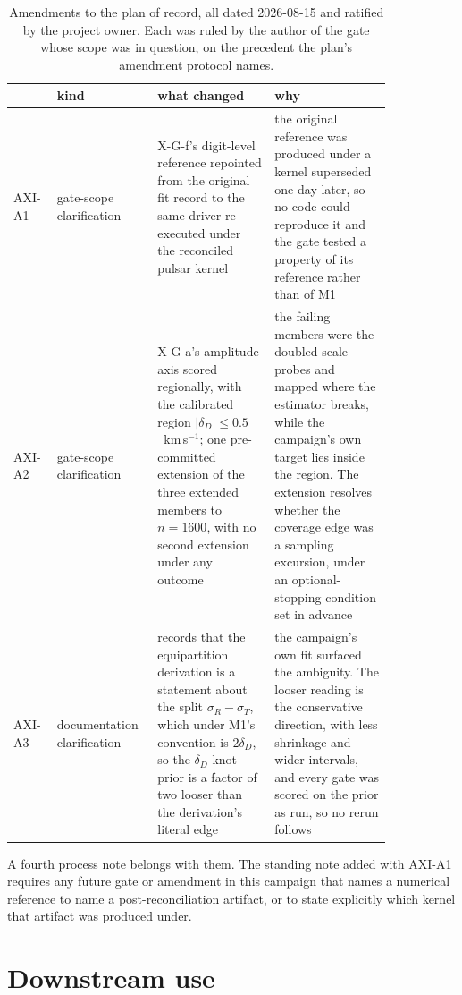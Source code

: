 \documentclass[11pt]{article}
\newcommand{\dD}{\ensuremath{\delta_D}}
\begin{document}
\begin{table}[htbp]
\centering
\small
\caption{Amendments to the plan of record, all dated 2026-08-15 and ratified by the project owner. Each was ruled by the author of the gate whose scope was in question, on the precedent the plan's amendment protocol names.}
\label{tab:amendments}
\begin{tabular}{p{0.09\linewidth}p{0.17\linewidth}p{0.29\linewidth}p{0.29\linewidth}}
\toprule
& kind & what changed & why \\
\midrule
AXI-A1 & gate-scope clarification & X-G-f's digit-level reference repointed from the original fit record to the same driver re-executed under the reconciled pulsar kernel & the original reference was produced under a kernel superseded one day later, so no code could reproduce it and the gate tested a property of its reference rather than of M1 \\[3pt]
AXI-A2 & gate-scope clarification & X-G-a's amplitude axis scored regionally, with the calibrated region $|\dD| \leq 0.5$~km\,s$^{-1}$; one pre-committed extension of the three extended members to $n = 1600$, with no second extension under any outcome & the failing members were the doubled-scale probes and mapped where the estimator breaks, while the campaign's own target lies inside the region. The extension resolves whether the coverage edge was a sampling excursion, under an optional-stopping condition set in advance \\[3pt]
AXI-A3 & documentation clarification & records that the equipartition derivation is a statement about the split $\sigma_R - \sigma_T$, which under M1's convention is $2\dD$, so the \dD{} knot prior is a factor of two looser than the derivation's literal edge & the campaign's own fit surfaced the ambiguity. The looser reading is the conservative direction, with less shrinkage and wider intervals, and every gate was scored on the prior as run, so no rerun follows \\
\bottomrule
\end{tabular}
\end{table}

A fourth process note belongs with them. The standing note added with AXI-A1 requires any future gate or amendment in this campaign that names a numerical reference to name a post-reconciliation artifact, or to state explicitly which kernel that artifact was produced under.

\section{Downstream use}
\label{sec:feeds}
\end{document}
